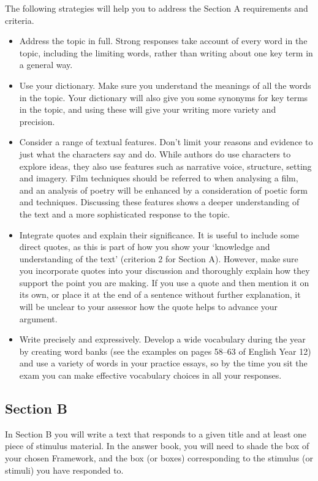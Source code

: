 \documentclass[a4paper]{article}
\begin{document}
The following strategies will help you to address the Section A requirements and criteria.\\

\begin{itemize}
    \item Address the topic in full. Strong responses take account of every word in the topic, including the limiting words, rather than writing about one key term in a general way.

\item Use your dictionary. Make sure you understand the meanings of all the words in the topic. Your dictionary will also give you some synonyms for key terms in the topic, and using these will give your writing more variety and precision.

\item Consider a range of textual features. Don’t limit your reasons and evidence to just what the characters say and do. While authors do use characters to explore ideas, they also use features such as narrative voice, structure, setting and imagery. Film techniques should be referred to when analysing a film, and an analysis of poetry will be enhanced by a consideration of poetic form and techniques. Discussing these features shows a deeper understanding of the text and a more sophisticated response to the topic.

\item Integrate quotes and explain their significance. It is useful to include some direct quotes, as this is part of how you show your ‘knowledge and understanding of the text’ (criterion 2 for Section A). However, make sure you incorporate quotes into your discussion and thoroughly explain how they support the point you are making. If you use a quote and then mention it on its own, or place it at the end of a sentence without further explanation, it will be unclear to your assessor how the quote helps to advance your argument.

\item Write precisely and expressively. Develop a wide vocabulary during the year by creating word banks (see the examples on pages 58–63 of English Year 12) and use a variety of words in your practice essays, so by the time you sit the exam you can make effective vocabulary choices in all your responses.
\end{itemize}


\subsection{Section B}
In Section B you will write a text that responds to a given title and at least one piece of stimulus material. In the answer book, you will need to shade the box of your chosen Framework, and the box (or boxes) corresponding to the stimulus (or stimuli) you have responded to.\\
\end{document}
